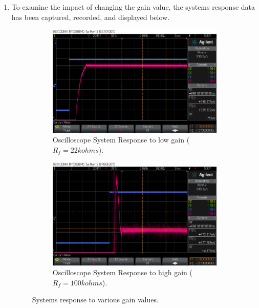 \documentclass[11pt,a4paper]{article}
\begin{document}
\begin{enumerate}
	
	
	
	
	
	
	
	
	\pagebreak
	\item To examine the impact of changing the gain value, the systems response data has been captured, recorded, and displayed below.
	\begin{figure}[H]
	  \begin{subfigure}{0.5\textwidth}
	  \includegraphics[width=0.95\linewidth]{Oscilloscope/PartD3_22k.png} 
	  \caption{Oscilloscope System Response to low gain ($R_f = 22k ohms$).}
	  \label{fig:subim1}
	  \end{subfigure}
	  \begin{subfigure}{0.5\textwidth}
	  \includegraphics[width=0.95\linewidth]{Oscilloscope/PartD3_100k.png}
	  \caption{Oscilloscope System Response to high gain ($R_f = 100k ohms$).}
	  \label{fig:subim2}
	  \end{subfigure}
	  \caption{\label{fig:gainimpact}Systems response to various gain values.}
	\end{figure}


\end{enumerate}
\end{document}
